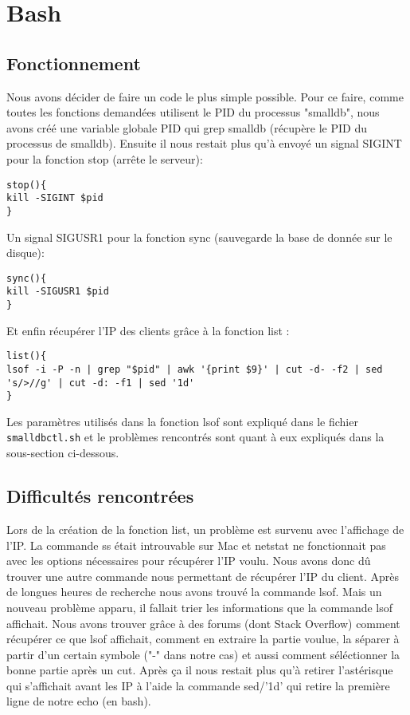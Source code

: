 \documentclass[utf8]{article}
\begin{document}
\section{Bash}

\subsection{Fonctionnement}

Nous avons décider de faire un code le plus simple possible. Pour ce faire, comme toutes les fonctions demandées utilisent le PID du processus "smalldb", nous avons créé une variable globale PID qui grep smalldb (récupère le PID du processus de smalldb). Ensuite il nous restait plus qu'à envoyé un signal SIGINT pour la fonction stop (arrête le serveur):

\begin{lstlisting}
stop(){
kill -SIGINT $pid
}
\end{lstlisting}

Un signal SIGUSR1 pour la fonction sync (sauvegarde la base de donnée sur le disque):

\begin{lstlisting}
sync(){
kill -SIGUSR1 $pid
}
\end{lstlisting}

Et enfin récupérer l'IP des clients grâce à la fonction list : 

\begin{lstlisting}
list(){
lsof -i -P -n | grep "$pid" | awk '{print $9}' | cut -d- -f2 | sed 's/>//g' | cut -d: -f1 | sed '1d'
}
\end{lstlisting}

Les paramètres utilisés dans la fonction lsof sont expliqué dans le fichier \texttt{smalldbctl.sh} et le problèmes rencontrés sont quant à eux expliqués dans la sous-section ci-dessous.

\subsection{Difficultés rencontrées}

Lors de la création de la fonction list, un problème est survenu avec l'affichage de l'IP. La commande ss était introuvable sur Mac et netstat ne fonctionnait pas avec les options nécessaires pour récupérer l'IP voulu. 
Nous avons donc dû trouver une autre commande nous permettant de récupérer l'IP du client.
Après de longues heures de recherche nous avons trouvé la commande lsof. Mais un nouveau problème apparu, il fallait trier les informations que la commande lsof affichait. Nous avons trouver grâce à des forums (dont Stack Overflow) comment récupérer ce que lsof affichait, comment en extraire la partie voulue, la séparer à partir d'un certain symbole ("-" dans notre cas) et aussi comment séléctionner la bonne partie après un cut. Après ça il nous restait plus qu'à retirer l'astérisque qui s'affichait avant les IP à l'aide la commande sed/'1d' qui retire la première ligne de notre echo (en bash).
\end{document}
